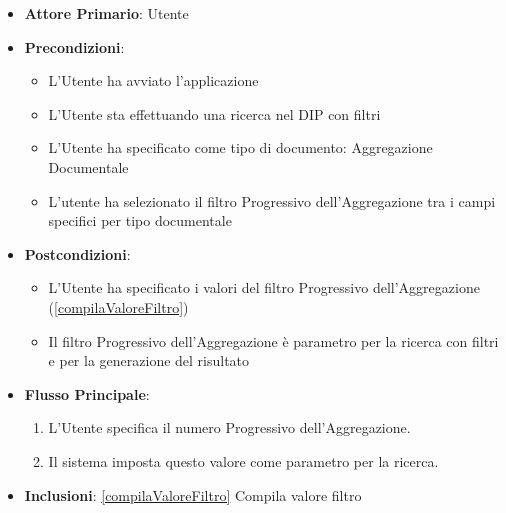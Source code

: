 \begin{itemize}
      \item \textbf{Attore Primario}: Utente
      \item \textbf{Precondizioni}: 
      \begin{itemize}
            \item L'Utente ha avviato l'applicazione
            \item L'Utente sta effettuando una ricerca nel DIP con filtri
            \item L'Utente ha specificato come tipo di documento: Aggregazione Documentale
            \item L'utente ha selezionato il filtro Progressivo dell'Aggregazione tra i campi specifici per tipo documentale
      \end{itemize}
      \item \textbf{Postcondizioni}: 
      \begin{itemize}
            \item L'Utente ha specificato i valori del filtro Progressivo dell'Aggregazione (\ref{compilaValoreFiltro})
            \item Il filtro Progressivo dell'Aggregazione è parametro per la ricerca con filtri e per la generazione del risultato
      \end{itemize}
      \item \textbf{Flusso Principale}:
      \begin{enumerate}
            \item L'Utente specifica il numero Progressivo dell'Aggregazione.
            \item Il sistema imposta questo valore come parametro per la ricerca.
      \end{enumerate}
      \item \textbf{Inclusioni}: \ref{compilaValoreFiltro} Compila valore filtro
\end{itemize}



